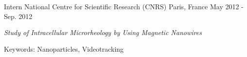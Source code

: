 \begin{cventries}
  \cventry
    {Intern} %
    {National Centre for Scientific Research (CNRS)} %
    {Paris, France} %
    {May 2012 - Sep. 2012} %
    {
      \begin{cvitems} %
        \item {\textit{Study of Intracellular Microrheology by Using Magnetic Nanowires} \hyperlink{SKD+14}{\honordatestyle{[SKD+14]}}}
        \item {Keywords: Nanoparticles, Videotracking}
      \end{cvitems}
    }

%

\end{cventries}